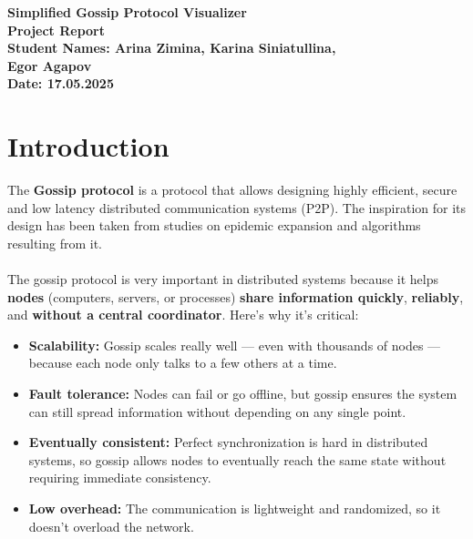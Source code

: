 \documentclass[a4paper,12pt]{article}
\begin{document}
\begin{titlepage}
    \centering
    {\Large \textbf{Simplified Gossip Protocol Visualizer}}\\[1cm]
    \textbf{Project Report}\\[0.5cm]
    \vfill
    \textbf{Student Names: Arina Zimina, Karina Siniatullina,} \\[0.3cm]
    \textbf{Egor Agapov} \\[0.5cm]
    \textbf{Date: 17.05.2025} \\[2cm]
    \vfill
\end{titlepage}

\section{Introduction}

The \textbf{Gossip protocol} is a protocol that allows designing highly efficient, secure and low latency distributed communication systems (P2P). The inspiration for its design has been taken from studies on epidemic expansion and algorithms resulting from it. \\\\
The gossip protocol is very important in distributed systems because it helps \textbf{nodes} (computers, servers, or processes) \textbf{share information quickly}, \textbf{reliably}, and \textbf{without a central coordinator}. Here's why it's critical:
\begin{itemize}
    \item \textbf{Scalability:} Gossip scales really well — even with thousands of nodes — because each node only talks to a few others at a time.
    \item \textbf{Fault tolerance:} Nodes can fail or go offline, but gossip ensures the system can still spread information without depending on any single point.
    \item \textbf{Eventually consistent:} Perfect synchronization is hard in distributed systems, so gossip allows nodes to eventually reach the same state without requiring immediate consistency.
    \item \textbf{Low overhead:} The communication is lightweight and randomized, so it doesn't overload the network.
\end{itemize}
\end{document}
